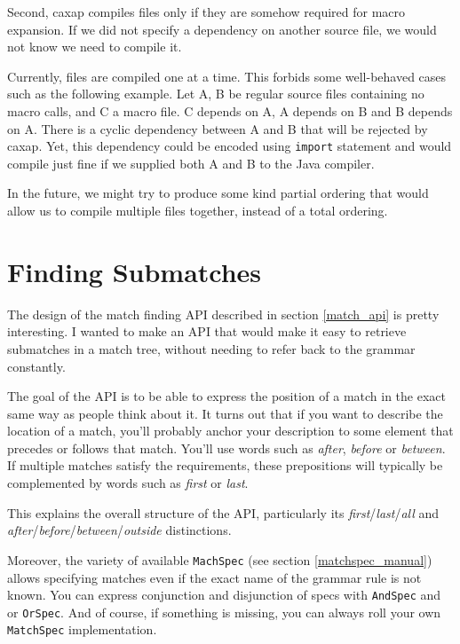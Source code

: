Second, caxap compiles files only if they are somehow required for macro
expansion. If we did not specify a dependency on another source file, we would
not know we need to compile it.

Currently, files are compiled one at a time. This forbids some well-behaved
cases such as the following example. Let A, B be regular source files containing
no macro calls, and C a macro file. C depends on A, A depends on B and B depends
on A. There is a cyclic dependency between A and B that will be rejected by
caxap. Yet, this dependency could be encoded using \texttt{import} statement and
would compile just fine if we supplied both A and B to the Java compiler.

In the future, we might try to produce some kind partial ordering that would
allow us to compile multiple files together, instead of a total ordering.

\section{Finding Submatches}

The design of the match finding API described in section \ref{match_api} is
pretty interesting. I wanted to make an API that would make it easy to retrieve
submatches in a match tree, without needing to refer back to the grammar
constantly.

The goal of the API is to be able to express the position of a match in the
exact same way as people think about it. It turns out that if you want to
describe the location of a match, you'll probably anchor your description to
some element that precedes or follows that match. You'll use words such as
\emph{after}, \emph{before} or \emph{between}. If multiple matches satisfy the
requirements, these prepositions will typically be complemented by words such as
\emph{first} or \emph{last}.

This explains the overall structure of the API, particularly its
\emph{first}/\emph{last}/\emph{all} and
\emph{after}/\emph{before}/\emph{between}/\emph{outside} distinctions.

Moreover, the variety of available \texttt{MachSpec} (see section
\ref{matchspec_manual}) allows specifying matches even if the exact name of the
grammar rule is not known. You can express conjunction and disjunction of specs
with \texttt{AndSpec} and or \texttt{OrSpec}. And of course, if something is
missing, you can always roll your own \texttt{MatchSpec} implementation.


